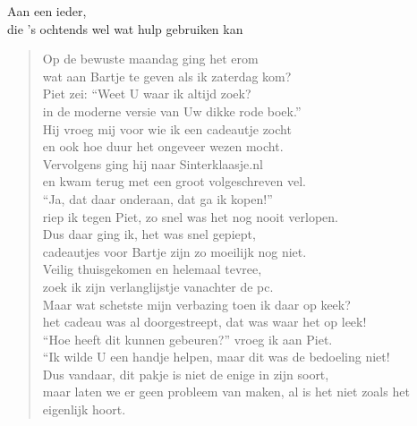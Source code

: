 \documentclass[12pt]{brief}
\date{4 december 2004}
\begin{document}
\begin{letter}{Aan een ieder,\\
die 's ochtends wel wat hulp gebruiken kan}

\opening{}


\begin{verse}

Op de bewuste maandag ging het erom\\
wat aan Bartje te geven als ik zaterdag kom?\\[0.5em]

Piet zei: ``Weet U waar ik altijd zoek?\\
in de moderne versie van Uw dikke rode boek.''\\[0.5em]

Hij vroeg mij voor wie ik een cadeautje zocht\\
en ook hoe duur het ongeveer wezen mocht.\\[0.5em]

Vervolgens ging hij naar Sinterklaasje.nl\\
en kwam terug met een groot volgeschreven vel.\\[0.5em]

``Ja, dat daar onderaan, dat ga ik kopen!''\\
riep ik tegen Piet, zo snel was het nog nooit verlopen.\\[2em]


Dus daar ging ik, het was snel gepiept,\\
cadeautjes voor Bartje zijn zo moeilijk nog niet.\\[0.5em]

Veilig thuisgekomen en helemaal tevree,\\
zoek ik zijn verlanglijstje vanachter de pc.\\[0.5em]

Maar wat schetste mijn verbazing toen ik daar op keek?\\
het cadeau was al doorgestreept, dat was waar het op leek!\\[0.5em]

``Hoe heeft dit kunnen gebeuren?'' vroeg ik aan Piet.\\
``Ik wilde U een handje helpen, maar dit was de bedoeling niet!\\[2em]


Dus vandaar, dit pakje is niet de enige in zijn soort,\\
maar laten we er geen probleem van maken, al is het niet zoals het eigenlijk hoort.\\[0.5em]


\end{verse}
\end{letter}
\end{document}
